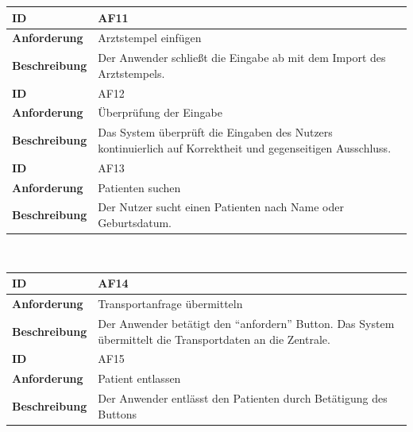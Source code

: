 \documentclass[a4paper, ngerman, 12pt]{scrartcl}
\begin{document}
\begin{tabular}{|l|p{10cm}|}
\hline
\hline
\cellcolor{lightgray}\textbf{ID}&AF11\\
\hline
\cellcolor{lightgray}\textbf{Anforderung}&Arztstempel einfügen\\
\hline
\cellcolor{lightgray}\textbf{Beschreibung}&Der Anwender schließt die Eingabe ab mit dem Import des Arztstempels.\\
\hline
\hline
\cellcolor{lightgray}\textbf{ID}&AF12\\
\hline
\cellcolor{lightgray}\textbf{Anforderung}&Überprüfung der Eingabe\\
\hline
\cellcolor{lightgray}\textbf{Beschreibung}&Das System überprüft die Eingaben des Nutzers kontinuierlich auf Korrektheit und gegenseitigen Ausschluss.\\
\hline
\hline
\cellcolor{lightgray}\textbf{ID}&AF13\\
\hline
\cellcolor{lightgray}\textbf{Anforderung}&Patienten suchen\\
\hline
\cellcolor{lightgray}\textbf{Beschreibung}&Der Nutzer sucht einen Patienten nach Name oder Geburtsdatum.\\
\hline
\end{tabular}\\
\newpage
\begin{tabular}{|l|p{10cm}|}
\hline
\cellcolor{lightgray}\textbf{ID}&AF14\\
\hline
\cellcolor{lightgray}\textbf{Anforderung}&Transportanfrage übermitteln\\
\hline
\cellcolor{lightgray}\textbf{Beschreibung}&Der Anwender betätigt den ``anfordern'' Button. Das System übermittelt die Transportdaten an die Zentrale.\\
\hline
\hline
\cellcolor{lightgray}\textbf{ID}&AF15\\
\hline
\cellcolor{lightgray}\textbf{Anforderung}&Patient entlassen\\
\hline
\cellcolor{lightgray}\textbf{Beschreibung}&Der Anwender entlässt den Patienten durch Betätigung des Buttons\\
\hline
\end{tabular}\\[2em]
\end{document}
